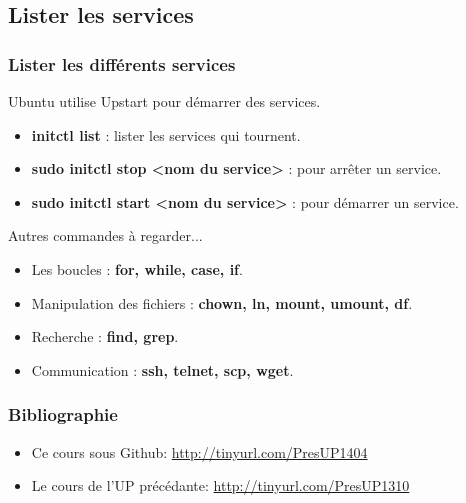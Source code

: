 \documentclass{beamer}
\begin{document}
    \subsection{Lister les services}
    \begin{frame}
        \frametitle{Lister les différents services}
        Ubuntu utilise Upstart pour démarrer des services.
        \begin{itemize}
            \item {\bf initctl list} : lister les services qui tournent.
            \item {\bf sudo initctl stop <nom du service>} : pour arrêter un service.
            \item {\bf sudo initctl start <nom du service>} : pour démarrer un service.
        \end{itemize}
    \end{frame}

    \begin{frame}{Autres commandes à regarder...}
        \begin{itemize}
            \item Les boucles : {\bf for, while, case, if}.
            \item Manipulation des fichiers : {\bf chown, ln, mount, umount, df}.
            \item Recherche : {\bf find, grep}.
            \item Communication : {\bf ssh, telnet, scp, wget}.
        \end{itemize}
    \end{frame}

    \begin{frame}[plain]
        \frametitle{Bibliographie}
        \begin{itemize}
            \item Ce cours sous Github:
                \newline \href{http://tinyurl.com/PresUP1404}{http://tinyurl.com/PresUP1404}

            \item Le cours de l'UP précédante:
                \newline \href{http://tinyurl.com/PresUP1310} {http://tinyurl.com/PresUP1310}          
        \end{itemize}

    \end{frame}
\end{document}
